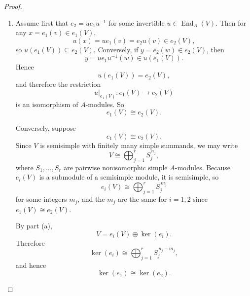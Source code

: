 \begin{proof}
\begin{enumerate}
              Hence \(e\) is primitive if and only if \(e(V)\) is indecomposable.

        \item Assume first that \(e_2=u e_1 u^{-1}\) for some invertible
              \(u\in \operatorname{End}_A(V)\). Then for any \(x=e_1(v)\in e_1(V)\),
              \[
                  u(x)=u e_1(v)=e_2u(v)\in e_2(V),
              \]
              so \(u(e_1(V))\subseteq e_2(V)\). Conversely, if \(y=e_2(w)\in e_2(V)\), then
              \[
                  y=u e_1 u^{-1}(w)\in u(e_1(V)).
              \]
              Hence
              \[
                  u(e_1(V))=e_2(V),
              \]
              and therefore the restriction
              \[
                  u|_{e_1(V)}\colon e_1(V)\to e_2(V)
              \]
              is an isomorphism of \(A\)-modules. So
              \[
                  e_1(V)\cong e_2(V).
              \]

              Conversely, suppose
              \[
                  e_1(V)\cong e_2(V).
              \]
              Since \(V\) is semisimple with finitely many simple summands, we may write
              \[
                  V\cong \bigoplus_{j=1}^r S_j^{\,n_j},
              \]
              where \(S_1,\dots,S_r\) are pairwise nonisomorphic simple \(A\)-modules.
              Because \(e_i(V)\) is a submodule of a semisimple module, it is semisimple, so
              \[
                  e_i(V)\cong \bigoplus_{j=1}^r S_j^{\,m_j}
              \]
              for some integers \(m_j\), and the \(m_j\) are the same for \(i=1,2\) since
              \(e_1(V)\cong e_2(V)\).

              By part (a),
              \[
                  V=e_i(V)\oplus \ker(e_i).
              \]
              Therefore
              \[
                  \ker(e_i)\cong \bigoplus_{j=1}^r S_j^{\,n_j-m_j},
              \]
              and hence
              \[
                  \ker(e_1)\cong \ker(e_2).
              \]


\end{enumerate}
\end{proof}

